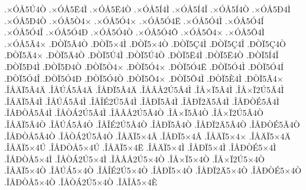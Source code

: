 {.^^d7^^d3^^c55^^da4^^d2
.^^d7^^d3^^c55^^cb4^^cc
.^^d7^^d3^^c55^^cb4^^d2
.^^d7^^d3^^c55^^cd4^^cc
.^^d7^^d3^^c55^^cd4^^ce
.^^d7^^d3^^c55^^cd4^^d2
.^^d7^^d3^^c55^^d04^^cc
.^^d7^^d3^^c55^^d04^^d2
.^^d7^^d3^^c55^^d24^^d7
.^^d7^^d3^^c55^^d34^^d7
.^^d7^^d3^^c55^^d34^^cb
.^^d7^^d3^^c55^^d34^^cc
.^^d7^^d3^^c55^^d34^^cd
.^^d7^^d3^^c55^^d34^^ce
.^^d7^^d3^^c55^^d34^^d0
.^^d7^^d3^^c55^^d34^^d2
.^^d7^^d3^^c55^^d34^^d4
.^^d7^^d3^^c55^^d44^^d7
.^^d7^^d3^^c55^^d44^^cc
.^^d7^^d3^^c55^^c34^^d7
.^^d0^^d2^^cf5^^c24^^d2
.^^d0^^d2^^cf5^^d74^^cc
.^^d0^^d2^^cf5^^d74^^d2
.^^d0^^d2^^cf5^^c74^^cc
.^^d0^^d2^^cf5^^c74^^ce
.^^d0^^d2^^cf5^^c74^^d2
.^^d0^^d2^^cf5^^c44^^d7
.^^d0^^d2^^cf5^^c44^^d2
.^^d0^^d2^^cf5^^da4^^cc
.^^d0^^d2^^cf5^^da4^^d2
.^^d0^^d2^^cf5^^cb4^^cc
.^^d0^^d2^^cf5^^cb4^^d2
.^^d0^^d2^^cf5^^cd4^^ce
.^^d0^^d2^^cf5^^d04^^cc
.^^d0^^d2^^cf5^^d04^^d2
.^^d0^^d2^^cf5^^d24^^d7
.^^d0^^d2^^cf5^^d34^^d7
.^^d0^^d2^^cf5^^d34^^cb
.^^d0^^d2^^cf5^^d34^^cc
.^^d0^^d2^^cf5^^d34^^cd
.^^d0^^d2^^cf5^^d34^^ce
.^^d0^^d2^^cf5^^d34^^d0
.^^d0^^d2^^cf5^^d34^^d2
.^^d0^^d2^^cf5^^d44^^d7
.^^d0^^d2^^cf5^^d44^^cc
.^^d0^^d2^^cf5^^c84^^cc
.^^d0^^d2^^cf5^^c34^^d7
.^^ce^^c5^^c4^^cf5^^c24^^c4
.^^ce^^c5^^da^^c15^^c24^^c4
.^^ce^^c5^^d0^^cf5^^c24^^c4
.^^ce^^c5^^c2^^c52^^da5^^c24^^cc
.^^ce^^c5^^d7^^cf5^^c24^^cc
.^^ce^^c5^^d7^^cf2^^da5^^c24^^cc
.^^ce^^c5^^c4^^cf5^^c24^^cc
.^^ce^^c5^^da^^c15^^c24^^cc
.^^ce^^c5^^ce^^c92^^da5^^c24^^cc
.^^ce^^c5^^d0^^cf5^^c24^^cc
.^^ce^^c5^^d0^^cf2^^c45^^c24^^cc
.^^ce^^c5^^d0^^d2^^c95^^c24^^cc
.^^ce^^c5^^d0^^d2^^c55^^c24^^cc
.^^ce^^c5^^d2^^c12^^da5^^c24^^cc
.^^ce^^c5^^c2^^c52^^da5^^c24^^d2
.^^ce^^c5^^d7^^cf5^^c24^^d2
.^^ce^^c5^^d7^^cf2^^da5^^c24^^d2
.^^ce^^c5^^c4^^cf5^^c24^^d2
.^^ce^^c5^^da^^c15^^c24^^d2
.^^ce^^c5^^ce^^c92^^da5^^c24^^d2
.^^ce^^c5^^d0^^cf5^^c24^^d2
.^^ce^^c5^^d0^^cf2^^c45^^c24^^d2
.^^ce^^c5^^d0^^d2^^c95^^c24^^d2
.^^ce^^c5^^d0^^d2^^c55^^c24^^d2
.^^ce^^c5^^d2^^c12^^da5^^c24^^d2
.^^ce^^c5^^c4^^cf5^^d74^^c2
.^^ce^^c5^^d0^^cf5^^d74^^c2
.^^ce^^c5^^c4^^cf5^^d74^^d7
.^^ce^^c5^^c4^^cf5^^d74^^c4
.^^ce^^c5^^c4^^cf5^^d74^^da
.^^ce^^c5^^d0^^d2^^c55^^d74^^da
.^^ce^^c5^^c4^^cf5^^d74^^cb
.^^ce^^c5^^c4^^cf5^^d74^^cc
.^^ce^^c5^^d0^^cf5^^d74^^cc
.^^ce^^c5^^d0^^d2^^c95^^d74^^cc
.^^ce^^c5^^d0^^d2^^c55^^d74^^cc
.^^ce^^c5^^d2^^c12^^da5^^d74^^cc
.^^ce^^c5^^c2^^c52^^da5^^d74^^d2
.^^ce^^c5^^d7^^cf5^^d74^^d2
.^^ce^^c5^^d7^^cf2^^da5^^d74^^d2
.^^ce^^c5^^c4^^cf5^^d74^^d2
.^^ce^^c5^^da^^c15^^d74^^d2
.^^ce^^c5^^ce^^c92^^da5^^d74^^d2
.^^ce^^c5^^d0^^cf5^^d74^^d2
.^^ce^^c5^^d0^^cf2^^c45^^d74^^d2
.^^ce^^c5^^d0^^d2^^c95^^d74^^d2
.^^ce^^c5^^d0^^d2^^c55^^d74^^d2
.^^ce^^c5^^d2^^c12^^da5^^d74^^d2
.^^ce^^c5^^ce^^c55^^d74^^c8
}
